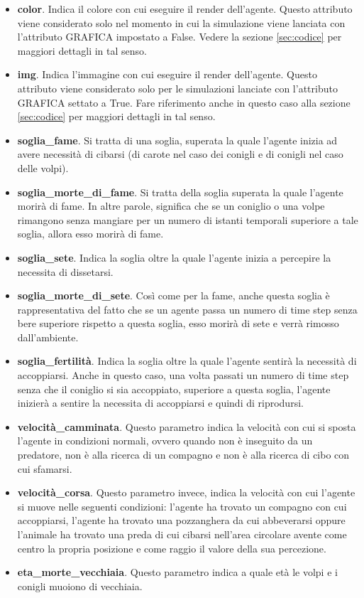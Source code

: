 \documentclass[11pt]{article}
\begin{document}
\begin{itemize}
    \item \textbf{color}. Indica il colore con cui eseguire il render dell'agente. Questo attributo viene considerato solo nel momento in cui la simulazione viene lanciata con l'attributo GRAFICA impostato a False. Vedere la sezione \ref{sec:codice} per maggiori dettagli in tal senso. 
    \item \textbf{img}. Indica l'immagine con cui eseguire il render dell'agente. Questo attributo viene considerato solo per le simulazioni lanciate con l'attributo GRAFICA settato a True. Fare riferimento anche in questo caso alla sezione \ref{sec:codice} per maggiori dettagli in tal senso. 
    \item \textbf{soglia\_fame}. Si tratta di una soglia, superata la quale l'agente inizia ad avere necessità di cibarsi (di carote nel caso dei conigli e di conigli nel caso delle volpi).
    \item \textbf{soglia\_morte\_di\_fame}. Si tratta della soglia superata la quale l'agente morirà di fame. In altre parole, significa che se un coniglio o una volpe rimangono senza mangiare per un numero di istanti temporali superiore a tale soglia, allora esso morirà di fame.
    \item \textbf{soglia\_sete}. Indica la soglia oltre la quale l'agente inizia a percepire la necessita di dissetarsi. 
    \item \textbf{soglia\_morte\_di\_sete}. Così come per la fame, anche questa soglia è rappresentativa del fatto che se un agente passa un numero di time step senza bere superiore rispetto a questa soglia,  esso morirà di sete e verrà rimosso dall'ambiente. 
    \item \textbf{soglia\_fertilità}. Indica la soglia oltre la quale l'agente sentirà la necessità di accoppiarsi. Anche in questo caso, una volta passati un numero di time step senza che il coniglio si sia accoppiato, superiore a questa soglia, l'agente inizierà a sentire la necessita di accoppiarsi e quindi di riprodursi.
    \item \textbf{velocità\_camminata}. Questo parametro indica la velocità con cui si sposta l'agente in condizioni normali, ovvero quando non è inseguito da un predatore, non è alla ricerca di un compagno e non è alla ricerca di cibo con cui sfamarsi.  
    \item \textbf{velocità\_corsa}. Questo parametro invece, indica la velocità con cui l'agente si muove nelle seguenti condizioni: l'agente ha trovato un compagno con cui accoppiarsi, l'agente ha trovato una pozzanghera da cui abbeverarsi oppure l'animale ha trovato una preda di cui cibarsi nell'area circolare avente come centro la propria posizione e come raggio il valore della sua percezione.
    \item \textbf{eta\_morte\_vecchiaia}. Questo parametro indica a quale età le volpi e i conigli muoiono di vecchiaia.
\end{itemize}
\end{document}
